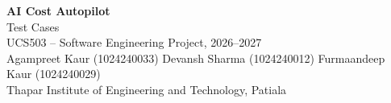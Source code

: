 \documentclass[11pt,a4paper]{article}
\begin{document}
\begin{center}
    {\Large\bfseries AI Cost Autopilot}\\[0.25cm]
    {\large Test Cases}\\[0.5cm]
    {\normalsize UCS503 -- Software Engineering Project, 2026--2027}\\[0.15cm]
    {\small Agampreet Kaur (1024240033) \quad Devansh Sharma (1024240012)
            \quad Furmaandeep Kaur (1024240029)}\\[0.15cm]
    {\small Thapar Institute of Engineering and Technology, Patiala}
\end{center}

\vspace{0.4cm}


\end{document}
